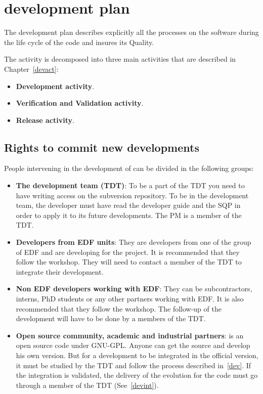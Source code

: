 \chapter{\telemacsystem{} development plan}
\label{devplan}

The development plan describes explicitly all the processes on the software
during the life cycle of the \telemacsystem{} code and insures its Quality.

The \telemacsystem{} activity is decomposed into three main activities that are
described in Chapter~\ref{devact}:
\begin{itemize}
\item \textbf{Development activity}.
\item \textbf{Verification and Validation activity}.
\item \textbf{Release activity}.
\end{itemize}

\section{Rights to commit new developments}

People intervening in the development of \telemacsystem{} can be divided in the
following groups:
\begin{itemize}
\item \textbf{The \telemacsystem{} development team (TDT)}: To be a part of the
  TDT you need to have writing access on the subversion repository. To be in
  the development team, the developer must have read the developer guide and
  the SQP in order to apply it to its future developments. The PM is a member
  of the TDT\@.
\item \textbf{Developers from EDF units}: They are developers from one of the
  group of EDF and are developing for the \telemacsystem{} project. It is
  recommended that they follow the \telemacsystem{} workshop. They will need to
  contact a member of the TDT to integrate their development.
\item \textbf{Non EDF developers working with EDF}: They can be subcontractors,
  interns, PhD students or any other partners working with EDF\@. It is also
  recommended that they follow the \telemacsystem{} workshop. The follow-up of
  the development will have to be done by a members of the TDT\@.
\item \textbf{Open source community, academic and industrial partners}:
  \telemacsystem{} is an open source code under GNU-GPL\@. Anyone can get the
  source and develop his own version. But for a development to be integrated in
  the official version, it must be studied by the TDT and follow the process
  described in~\ref{dev}. If the integration is validated, the delivery of the
  evolution for the code must go through a member of the TDT
  (See~\ref{devint}).
\end{itemize}

